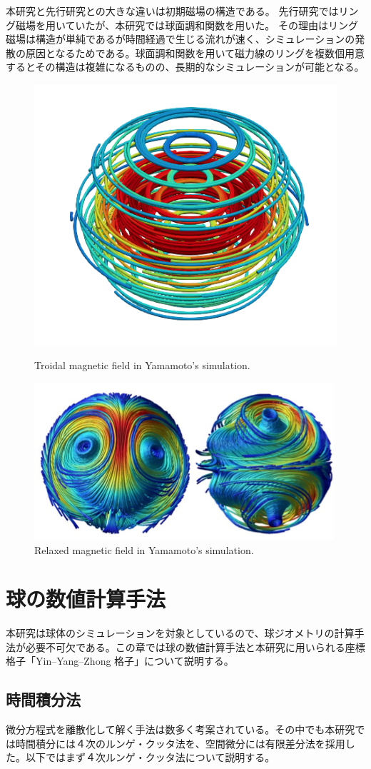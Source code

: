 \documentclass[12pt]{jsarticle}
\begin{document}
本研究と先行研究との大きな違いは初期磁場の構造である。
先行研究ではリング磁場を用いていたが、本研究では球面調和関数を用いた。
その理由はリング磁場は構造が単純であるが時間経過で生じる流れが速く、シミュレーションの発散の原因となるためである。球面調和関数を用いて磁力線のリングを複数個用意するとその構造は複雑になるものの、長期的なシミュレーションが可能となる。
 
\begin{figure}[H]
\centering
\includegraphics[height=0.3\textheight,width=0.6\hsize,angle=0,keepaspectratio]{./Image/init_mag_12.png}
\caption{Troidal magnetic field in Yamamoto's simulation.}\label{Mag1}
\includegraphics[height=0.3\textheight,width=0.6\hsize,angle=0,keepaspectratio]{./Image/Yamamoto_relaxation.png}
\caption{Relaxed magnetic field in Yamamoto's simulation.}\label{Mag2}
\end{figure}
 
 
\section{球の数値計算手法}

本研究は球体のシミュレーションを対象としているので、球ジオメトリの計算手法が必要不可欠である。この章では球の数値計算手法と本研究に用いられる座標格子「Yin--Yang--Zhong 格子」について説明する。
\subsection{時間積分法}
微分方程式を離散化して解く手法は数多く考案されている\cite{理工学のための数値計算法}。その中でも本研究では時間積分には４次のルンゲ・クッタ法を、空間微分には有限差分法を採用した。以下ではまず４次ルンゲ・クッタ法について説明する。
\end{document}
